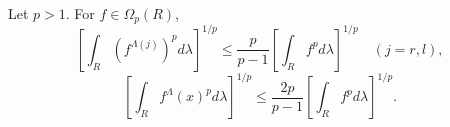 Let $p > 1$. For $f \in \Omega_p(R)$,
$$\left[\int_R (f^{\Lambda(j)})^p d\lambda\right]^{1/p} \leq \frac{p}{p-1} \left[\int_R f^p d\lambda\right]^{1/p} \quad (j=r,l),$$
$$\left[\int_R f^\Lambda(x)^p d\lambda\right]^{1/p} \leq \frac{2p}{p-1} \left[\int_R f^p d\lambda\right]^{1/p}.$$
